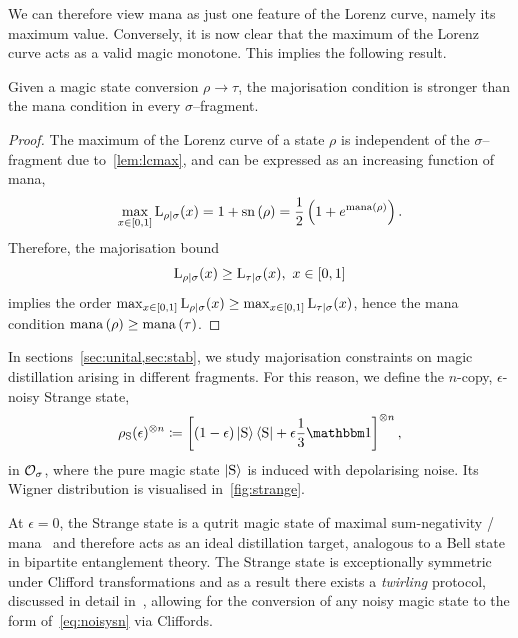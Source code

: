 \documentclass[pra,
aps,
twocolumn,
superscriptaddress,
groupedaddress,
nofootinbib,
reprint
]{revtex4-1}
\begin{document}
We can therefore view mana as just one feature of the Lorenz curve, namely its maximum value. 
Conversely, it is now clear that the maximum of the Lorenz curve acts as a valid magic monotone.
This implies the following result.
\begin{theorem}\label{thm:bounds}
    Given a magic state conversion $\rho \longrightarrow \tau$, the majorisation condition is stronger than the mana condition in every $\sigma$--fragment.
\end{theorem}
\begin{proof}
    The maximum of the Lorenz curve of a state $\rho$ is independent of the $\sigma$--fragment due to~\cref{lem:lcmax}, and can be expressed as an increasing function of mana,
    \begin{equation}
        \max_{x\in[0,1]}{{{\rm{L}}_{\rho|\sigma}}(x)} = 1 + {{\rm{sn}}\left(\rho\right)} = \frac{1}{2} \left( 1 + e^{{\rm{mana}}\left(\rho\right)} \right).
    \end{equation}
    Therefore, the majorisation bound
    \begin{equation}
    	\lc{\rho}{\sigma}(x) \geq \lc{\tau}{\sigma}(x),\ x\in[0,1]
    \end{equation}
    implies the order $\max_{x\in[0,1]}{{{\rm{L}}_{\rho|\sigma}}(x)} \geq \max_{x\in[0,1]}{{{\rm{L}}_{\tau|\sigma}}(x)}$, hence the mana condition ${{\rm{mana}}\left(\rho\right)} \geq {{\rm{mana}}\left(\tau\right)}$.
\end{proof}

In sections~\cref{sec:unital,sec:stab}, we study majorisation constraints on magic distillation arising in different fragments. 
For this reason, we define the $n$-copy, $\epsilon$-noisy Strange state,
\begin{equation}\label{eq:noisysn}
    \rho_{\rm{S}}(\epsilon)^{\otimes n} \coloneqq \left[ (1 - \epsilon) \ket{\rm{S}}\bra{\rm{S}} + \epsilon \frac{1}{3}\id \right]^{\otimes n},
\end{equation}
in $\mathcal{O}_\sigma$, where the pure magic state $\ket{\rm{S}}$ is induced with depolarising noise. 
Its Wigner distribution is visualised in~\cref{fig:strange}.

At $\epsilon=0$, the Strange state is a qutrit magic state of maximal sum-negativity / mana~\cite{cit:veitch2} and therefore acts as an ideal distillation target, analogous to a Bell state in bipartite entanglement theory.
The Strange state is exceptionally symmetric under Clifford transformations and as a result there exists a \emph{twirling} protocol, discussed in detail in~\cite{cit:prakash,cit:prakash2}, allowing for the conversion of any noisy magic state to the form of~\cref{eq:noisysn} via Cliffords.
\end{document}
